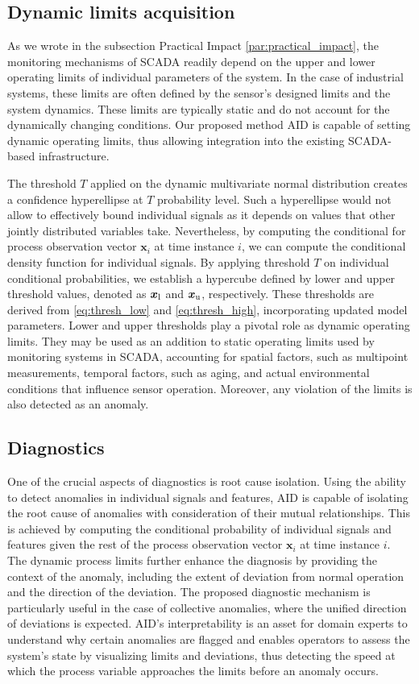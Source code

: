 \subsection{Dynamic limits acquisition}\label{limits}
As we wrote in the subsection Practical Impact \ref{par:practical_impact}, the monitoring mechanisms of SCADA readily depend on the upper and lower operating limits of individual parameters of the system. In the case of industrial systems, these limits are often defined by the sensor's designed limits and the system dynamics. These limits are typically static and do not account for the dynamically changing conditions. Our proposed method AID is capable of setting dynamic operating limits, thus allowing integration into the existing SCADA-based infrastructure.

The threshold $T$ applied on the dynamic multivariate normal distribution creates a confidence hyperellipse at $T$ probability level. Such a hyperellipse would not allow to effectively bound individual signals as it depends on values that other jointly distributed variables take. Nevertheless, by computing the conditional for process observation vector $\boldsymbol{x}_i$ at time instance $i$, we can compute the conditional density function for individual signals. By applying threshold $T$ on individual conditional probabilities, we establish a hypercube defined by lower and upper threshold values, denoted as $\boldsymbol{x} _{\text{l}}$ and $\boldsymbol{x} _{\text{u}}$, respectively. These thresholds are derived from \eqref{eq:thresh_low} and \eqref{eq:thresh_high}, incorporating updated model parameters. Lower and upper thresholds play a pivotal role as dynamic operating limits. They may be used as an addition to static operating limits used by monitoring systems in SCADA, accounting for spatial factors, such as multipoint measurements, temporal factors, such as aging, and actual environmental conditions that influence sensor operation. Moreover, any violation of the limits is also detected as an anomaly.

\subsection{Diagnostics}\label{diagnosis}
One of the crucial aspects of diagnostics is root cause isolation. Using the ability to detect anomalies in individual signals and features, AID is capable of isolating the root cause of anomalies with consideration of their mutual relationships. This is achieved by computing the conditional probability of individual signals and features given the rest of the process observation vector $\boldsymbol{x}_i$ at time instance $i$. The dynamic process limits further enhance the diagnosis by providing the context of the anomaly, including the extent of deviation from normal operation and the direction of the deviation. The proposed diagnostic mechanism is particularly useful in the case of collective anomalies, where the unified direction of deviations is expected. AID's interpretability is an asset for domain experts to understand why certain anomalies are flagged and enables operators to assess the system's state by visualizing limits and deviations, thus detecting the speed at which the process variable approaches the limits before an anomaly occurs.

